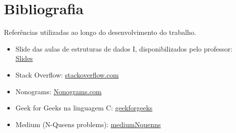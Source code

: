 \documentclass{article}
\begin{document}
\section{Bibliografia}

 Referências utilizadas ao longo do desenvolvimento do trabalho.
\begin{itemize}
    \item Slide das aulas de estruturas de dados I, disponibilizados pelo professor:
    \href{https://moodlepresencial.ufop.br/mod/url/view.php?id=1010854}{Slides}
    
    \item Stack Overflow:
    \href{https://stackoverflow.com/}{stackoverflow.com}
    
    \item Nonograms:  \href{https://www.bing.com/ck/a?!&&p=0abeba355b3d66f2d72b192379a2e33fbd4788f573d6eea7aa1f6a8605cbbdd9JmltdHM9MTczNzMzMTIwMA&ptn=3&ver=2&hsh=4&fclid=0dc038f5-9b1e-6e7a-2f81-2cc19a4f6fe3&psq=nonograms&u=a1aHR0cHM6Ly93d3cucHV6emxlLW5vbm9ncmFtcy5jb20v&ntb=1}{Nonograms.com}

    \item Geek for Geeks na linguagem C:
    \href{https://www.geeksforgeeks.org/c-programming-language/}{geekforgeeks}

    \item Medium (N-Queens problems):
    \href{https://medium.com/@1032211306/n-queens-problem-using-backtracking-approach-ef52385d8b00}{mediumNquenns}
    
\end{itemize}
\end{document}
